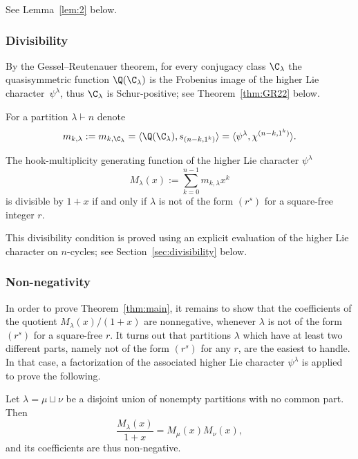 See Lemma~\ref{lem:2}  below.


\subsubsection{Divisibility} 

By the 
Gessel--Reutenauer theorem, 
for every conjugacy class $\C_\lambda$ 
the quasisymmetric function 
$\Q(\C_\lambda)$ is the Frobenius image of the higher Lie character~$\psi^\lambda$, thus  $\C_\lambda$ is  Schur-positive; 
see Theorem~\ref{thm:GR22} below.

For a partition $\lambda \vdash n$ denote
\begin{equation}\label{notation:m_k_hLc}
m_{k,\lambda} := m_{k,\C_\lambda}
= \langle \Q(\C_\lambda), s_{(n-k,1^k)} \rangle
= \langle \psi^\lambda, \chi^{(n-k,1^k)} \rangle.
\end{equation}
    
\begin{proposition}\label{prop:divisibility} 
    The hook-multiplicity generating function of the higher Lie character $\psi^\lambda$
    \[
        M_\lambda(x):=\sum\limits_{k=0}^{n-1}m_{k,\lambda}x^k
    \]
    is divisible by $1+x$ 
    if and only if $\lambda$ is not of the form $(r^s)$ for a square-free integer $r$.
\end{proposition}

This divisibility condition is proved using an explicit evaluation of the higher Lie character on $n$-cycles; see Section~\ref{sec:divisibility} below.

    
\subsubsection{Non-negativity} 

In order to prove Theorem~\ref{thm:main}, it remains to show that the coefficients of the quotient  $M_\lambda(x)/(1+x)$ are nonnegative, whenever $\lambda$ is not of the form $(r^s)$ for a square-free $r$. 
It turns out that partitions $\lambda$ which have at least two different parts, namely not of the form $(r^s)$ for any $r$, are the easiest to handle. 
In that case, a factorization of the associated higher Lie character $\psi^\lambda$ is applied to prove the following. 

\begin{lemma}\label{lem:distinct}
    Let $\lambda = \mu \sqcup \nu$ be a disjoint union of nonempty partitions with no common part. 
    Then
    \begin{equation}
        \frac{M_\lambda(x)}{1+x} = M_\mu(x) M_\nu(x),     
    \end{equation}
    and its coefficients are thus non-negative.
\end{lemma}	

